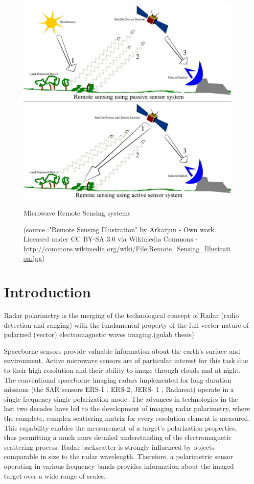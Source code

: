 \begin{figure}[!htbp]
	\centering
	\includegraphics[width=\columnwidth]{Figure_General/microwave_imaging_systems}
	\caption{Microwave Remote Sensing systems} 
	\caption*{\small(source :"Remote Sensing Illustration" by Arkarjun - Own work. Licensed under CC BY-SA 3.0 via Wikimedia Commons - \url{http://commons.wikimedia.org/wiki/File:Remote_Sensing_Illustration.jpg})}
	\label{fig:microwave_img_sys}
\end{figure}
\section{Introduction}

Radar polarimetry is the merging of the technological concept of Radar (radio detection and ranging) with the fundamental property of the full vector nature of polarized (vector) electromagnetic waves imaging.(gulab thesis)

Spaceborne sensors provide valuable information about the earth's surface and environment. Active microwave sensors are of particular interest for this task due to their high resolution and their ability to image through clouds and at night. The conventional spaceborne imaging radars implemented for long-duration missions (the SAR sensors ERS-1 , ERS-2, JERS- 1 , Radarsat) operate in a single-frequency single polarization mode. The advances in technologies in the last two decades have led to the development of imaging radar polarimetry, where the complete, complex scattering matrix for every resolution element is measured. This capability enables the measurement of a target's polarization properties, thus permitting a much more detailed understanding of the electromagnetic scattering process. Radar backscatter is strongly influenced by objects comparable in size to the radar wavelength. Therefore, a polarimetric sensor operating in various frequency bands provides information about the imaged target over a wide range of scales.


